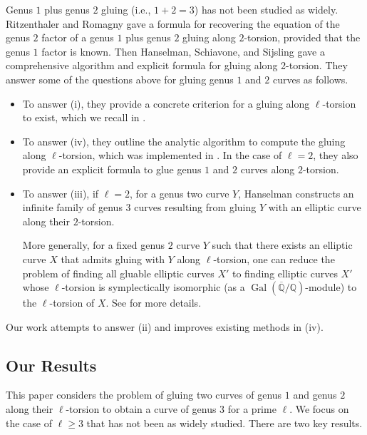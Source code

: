 \documentclass{amsproc}
\numberwithin{equation}{section}
\theoremstyle{definition}
\theoremstyle{remark}
\DeclareMathOperator{\Gal}{Gal}
\newcommand{\QQ}{\mathbb Q}
\newcommand{\Qbar}{\overline{\QQ}}
\newcommand{\GalQ}{\Gal(\Qbar/\QQ)}
\begin{document}
Genus $1$ plus genus $2$ gluing (i.e., $1+2=3$) has not been studied as widely. Ritzenthaler and Romagny \cite{reverse_1_plus_2} gave a formula for recovering the equation of the genus $2$ factor of a genus $1$ plus genus $2$ gluing along $2$-torsion, provided that the genus $1$ factor is known. Then Hanselman, Schiavone, and Sijsling \cite{1_plus_2_2_torsion_gluing} gave a comprehensive algorithm and explicit formula for gluing along 2-torsion.  
They answer some of the questions above for gluing genus $1$ and $2$ curves as follows.
\begin{itemize}
    \item To answer (i), they \cite[\S 1]{1_plus_2_2_torsion_gluing} provide a concrete criterion for a gluing along $\ell$-torsion to exist, which we recall in .
    \item To answer (iv), they \cite[\S 2.1]{1_plus_2_2_torsion_gluing} outline the analytic algorithm to compute the gluing along $\ell$-torsion, which was implemented in \cite{gluing_code}. In the case of $\ell=2$, they also provide an explicit formula to glue genus $1$ and $2$ curves along $2$-torsion.
    \item To answer (iii), if $\ell=2$, for a genus two curve $Y$, Hanselman \cite[\S 2.2]{HanselmanThesis} constructs an infinite family of genus $3$ curves resulting from gluing $Y$ with an elliptic curve along their $2$-torsion.
    
    More generally, for a fixed genus $2$ curve $Y$ such that there exists an elliptic curve $X$ that admits gluing with $Y$ along $\ell$-torsion, one can reduce the problem of finding all gluable elliptic curves $X'$ to finding elliptic curves $X'$ whose $\ell$-torsion is symplectically isomorphic (as a $\GalQ$-module) to the $\ell$-torsion of $X$. See  for more details.
\end{itemize}

Our work attempts to answer (ii) and improves existing methods in (iv).

\subsection{Our Results}
This paper considers the problem of gluing two curves of genus $1$ and genus $2$ along their $\ell$-torsion to obtain a curve of genus $3$ for a prime $\ell$. We focus on the case of $\ell\geq 3$ that has not been as widely studied. There are two key results.
\end{document}
